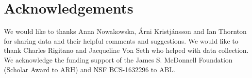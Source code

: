 \documentclass[Afour, sageapa, times]{sagej}
\begin{document}
\section*{Acknowledgements}

We would like to thanks Anna Nowakowska, {\'A}rni Kristj{\'a}nsson and Ian Thornton for sharing data and their helpful comments and suggestions. We would like to thank Charles Rigitano and Jacqueline Von Seth who helped with data collection. We acknowledge the funding support of the James S. McDonnell Foundation (Scholar Award to ARH) and NSF BCS-1632296 to ABL.



\end{document}
